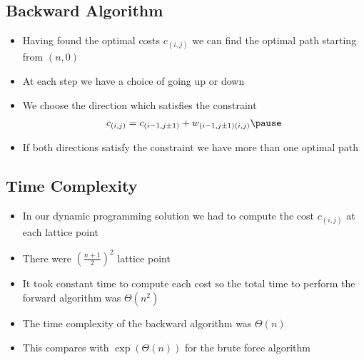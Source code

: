 \begin{slide}
\section{Backward Algorithm}

\begin{PauseHighLight}
  \begin{itemize}
  \item Having found the optimal costs $c_{(i,j)}$ we can find the
    optimal path starting from $(n,0)$\pause
  \item At each step we have a choice of going up or down\pause
  \item We choose the direction which satisfies the constraint
    \begin{align*}
      c_{(i,j)} = c_{(i-1,j\pm1)}+w_{(i-1,j\pm1)(i,j)}\pause
    \end{align*}
  \item If both directions satisfy the constraint we have more than one
    optimal path\pause
  \end{itemize}
\end{PauseHighLight}

\end{slide}


\begin{slide}
\section{Time Complexity}

\begin{PauseHighLight}
  \begin{itemize}
  \item In our dynamic programming solution we had to compute the cost
    $c_{(i,j)}$ at each lattice point\pause
  \item There were $(\frac{n+1}{2})^2$ lattice point\pause
  \item It took constant time to compute each cost so the total time to
    perform the forward algorithm was $\Theta(n^2)$\pause
  \item The time complexity of the backward algorithm was
    $\Theta(n)$\pause
  \item This compares with $\exp(\Theta(n))$ for the brute force
    algorithm\pause 
  \end{itemize}
\end{PauseHighLight}

\end{slide}

